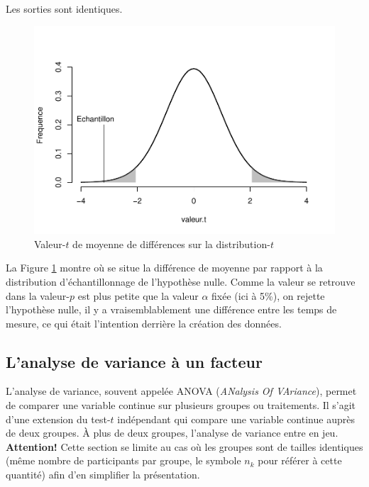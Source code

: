 \documentclass[
]{book}
\begin{document}
Les sorties sont identiques.

\begin{figure}

{\centering \includegraphics[width=0.75\linewidth,height=0.75\textheight]{09-Analyser_files/figure-latex/testtttt-1} 

}

\caption{Valeur-$t$ de moyenne de différences sur la distribution-$t$}\label{fig:testtttt}
\end{figure}

La Figure \ref{fig:testtttt} montre où se situe la différence de moyenne par rapport à la distribution d'échantillonnage de l'hypothèse nulle. Comme la valeur se retrouve dans la valeur-\(p\) est plus petite que la valeur \(\alpha\) fixée (ici à 5\%), on rejette l'hypothèse nulle, il y a vraisemblablement une différence entre les temps de mesure, ce qui était l'intention derrière la création des données.

\hypertarget{lanalyse-de-variance-uxe0-un-facteur}{%
\subsection{L'analyse de variance à un facteur}\label{lanalyse-de-variance-uxe0-un-facteur}}

L'analyse de variance, souvent appelée ANOVA (\emph{ANalysis Of VAriance}), permet de comparer une variable continue sur plusieurs groupes ou traitements. Il s'agit d'une extension du test-\(t\) indépendant qui compare une variable continue auprès de deux groupes. À plus de deux groupes, l'analyse de variance entre en jeu. \textbf{Attention!} Cette section se limite au cas où les groupes sont de tailles identiques (même nombre de participants par groupe, le symbole \(n_k\) pour référer à cette quantité) afin d'en simplifier la présentation.
\end{document}
